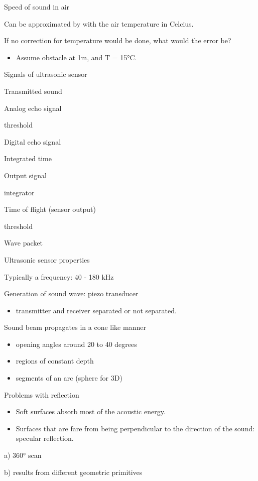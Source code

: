 \documentclass[compress]{beamer}
\providecommand{\tightlist}{%
  \setlength{\itemsep}{0pt}\setlength{\parskip}{0pt}}
\begin{document}
\begin{frame}{Speed of sound in air}

Can be approximated by with the air temperature in Celcius.

If no correction for temperature would be done, what would the error be?

\begin{itemize}
\tightlist
\item
  Assume obstacle at 1m, and T = 15°C.
\end{itemize}

\end{frame}

\begin{frame}{Signals of ultrasonic sensor}

Transmitted sound

Analog echo signal

threshold

Digital echo signal

Integrated time

Output signal

integrator

Time of flight (sensor output)

threshold

Wave packet

\end{frame}

\begin{frame}{Ultrasonic sensor properties}

Typically a frequency: 40 - 180 kHz

Generation of sound wave: piezo transducer

\begin{itemize}
\tightlist
\item
  transmitter and receiver separated or not separated.
\end{itemize}

Sound beam propagates in a cone like manner

\begin{itemize}
\tightlist
\item
  opening angles around 20 to 40 degrees
\item
  regions of constant depth
\item
  segments of an arc (sphere for 3D)
\end{itemize}

\end{frame}

\begin{frame}{Problems with reflection}

\begin{itemize}
\tightlist
\item
  Soft surfaces absorb most of the acoustic energy.
\item
  Surfaces that are fare from being perpendicular to the direction of
  the sound: specular reflection.
\end{itemize}

a) 360° scan

b) results from different geometric primitives

\end{frame}
\end{document}
